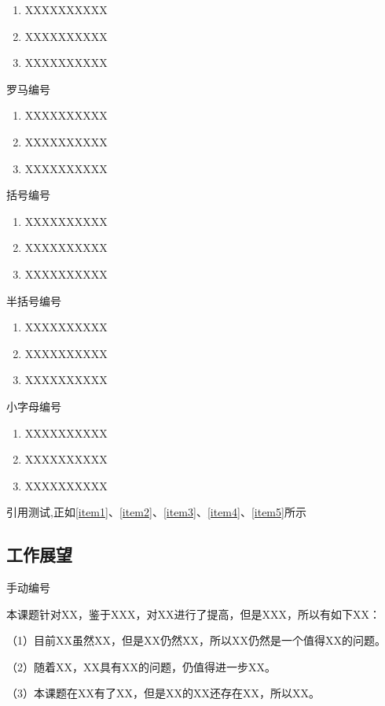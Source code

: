 \begin{enumerate}
 \item XXXXXXXXXX
 \label{item1}
 \item XXXXXXXXXX
 \item XXXXXXXXXX
\end{enumerate}
罗马编号
\begin{enumerate}[label=(\roman*)]
 \item XXXXXXXXXX
 \label{item2}
 \item XXXXXXXXXX
 \item XXXXXXXXXX
\end{enumerate}
括号编号
\begin{enumerate}[label=(\arabic*)]
 \item XXXXXXXXXX
 \label{item3}
 \item XXXXXXXXXX
 \item XXXXXXXXXX
\end{enumerate}
半括号编号
\begin{enumerate}[label=\arabic*)]
 \item XXXXXXXXXX
 \label{item4}
 \item XXXXXXXXXX
 \item XXXXXXXXXX
\end{enumerate}
小字母编号
\begin{enumerate}[label=\alph*)]
 \item XXXXXXXXXX
 \label{item5}
 \item XXXXXXXXXX
 \item XXXXXXXXXX
\end{enumerate}

引用测试,正如\ref{item1}、\ref{item2}、\ref{item3}、\ref{item4}、\ref{item5}所示

\subsection{工作展望}
手动编号 %
\par
本课题针对XX，鉴于XXX，对XX进行了提高，但是XXX，所以有如下XX：

（1）目前XX虽然XX，但是XX仍然XX，所以XX仍然是一个值得XX的问题。

（2）随着XX，XX具有XX的问题，仍值得进一步XX。

（3）本课题在XX有了XX，但是XX的XX还存在XX，所以XX。


\newpage
